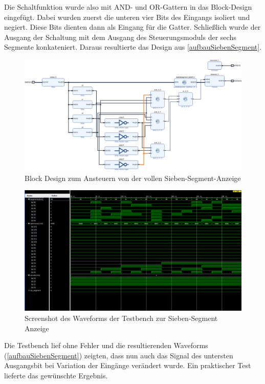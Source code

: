 \documentclass[11pt, a4paper]{article}
\begin{document}
Die Schaltfunktion wurde also mit AND- und OR-Gattern in das Block-Design eingefügt.
Dabei wurden zuerst die unteren vier Bits des Eingangs isoliert und negiert. Diese Bits dienten dann als Eingang für die Gatter. Schließlich wurde der Ausgang der Schaltung mit dem Ausgang des Steuerungsmoduls der sechs Segmente konkateniert.
Daraus resultierte das Design aus \autoref{aufbauSiebenSegment}.
\begin{figure}[H]    
    \centering
    \includegraphics[width=\linewidth]{versuch2Data/seven_segment_display.pdf}
    \caption{Block Design zum Ansteuern von der vollen Sieben-Segment-Anzeige}
    \label{aufbauSiebenSegment}        
\end{figure}
\begin{figure}[H]    
    \centering
    \includegraphics[width=\linewidth]{versuch2Data/aufgabe2.png}
    \caption{Screenshot des Waveforms der Testbench zur Sieben-Segment Anzeige}
    \label{waveformSiebenSegment}        
\end{figure}
Die Testbench lief ohne Fehler und die resultierenden Waveforms (\autoref{aufbauSiebenSegment}) zeigten, dass nun auch das Signal des untersten Ausgangsbit bei Variation der Eingänge verändert wurde. Ein praktischer Test lieferte das gewünschte Ergebnis.
\end{document}
